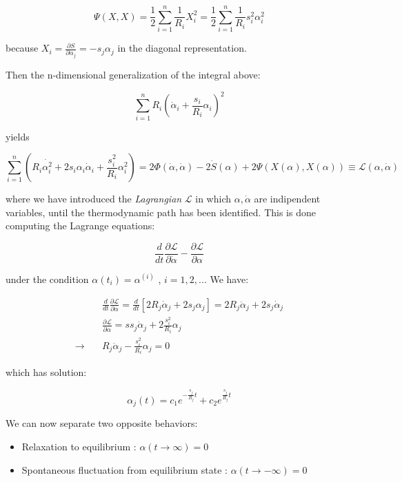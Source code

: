 \documentclass{article}
\begin{document}
$$ \Psi(X,X) =  \frac{1}{2} \sum_{i=1}^{n} \frac{1}{R_i} X^2_i =  \frac{1}{2} \sum_{i=1}^{n} \frac{1}{R_i} s_i^2 \alpha^2_i $$

because $X_i = \frac{\partial S}{\partial \alpha_j} = - s_j \alpha_j$ in the diagonal representation.

Then the n-dimensional generalization of the integral above:

$$ \sum_{i=1}^{n}R_i (\dot{\alpha}_i + \frac{s_i}{R_i}\alpha_i)^2 $$

yields

\begin{equation}
\sum_{i=1}^{n}(R_i \dot{\alpha_i^2}+2s_i \alpha_i \dot{\alpha}_i + \frac{s_i^2}{R_i} \alpha^2_i) = 2 \Phi(\dot{\alpha},\dot{\alpha}) -2 \dot{S}(\alpha) + 2\Psi(X(\alpha),X(\alpha)) \equiv \mathcal{L}(\alpha,\dot{\alpha})
\end{equation}

where we have introduced the \emph{Lagrangian} $\mathcal{L}$ in which $\alpha,\dot{\alpha}$ are indipendent variables, until the thermodynamic path has been identified. This is done computing the Lagrange equations:

$$\frac{d}{dt} \frac{\partial \mathcal{L}}{\partial \dot{\alpha}} -  \frac{\partial \mathcal{L}}{\partial\alpha}$$

under the condition $\alpha(t_i) = \alpha^{(i)}$ , $i=1,2,..$. We have:

\begin{align}
& \frac{d}{dt} \frac{\partial \mathcal{L}}{\partial \dot{\alpha}} = \frac{d}{dt} [2 R_j \dot{\alpha}_j + 2 s_j \alpha_j ] = 2 R_j \ddot{\alpha}_j +2s_j \dot{\alpha}_j \\
& \frac{\partial \mathcal{L}}{\partial\alpha} = s s_j \dot{\alpha}_j + 2 \frac{s_i^2}{R_i} \alpha_j \\
\rightarrow \quad & R_j \ddot{\alpha}_j -\frac{s_i^2}{R_i} \alpha_j = 0
\end{align}

which has solution:

\begin{equation}
 \alpha_j(t) = c_1 e^{-\frac{s_j}{R_j} t} + c_2 e^{\frac{s_j}{R_j} t}
\end{equation}

We can now separate two opposite behaviors:

\begin{itemize}
	\item Relaxation to equilibrium : $\alpha(t \to \infty) = 0$
	\item Spontaneous fluctuation from equilibrium state : $\alpha(t \to - \infty) = 0$
\end{itemize}
\end{document}
